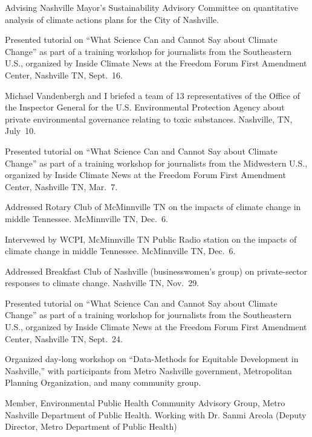 \item[2020--present] Advising Nashville Mayor's Sustainability Advisory Committee on quantitative analysis of climate actions plans for the City of Nashville.
\item[2019] Presented tutorial on ``What Science Can and Cannot Say about Climate Change'' as part of a training workshop for journalists from the Southeastern U.S., organized by Inside Climate News at the Freedom Forum First Amendment Center, Nashville TN, Sept.~16.
\item[2019] Michael Vandenbergh and I briefed a team of 13 representatives of the Office of the Inspector General for the U.S. Environmental Protection Agency about private environmental governance relating to toxic substances. Nashville, TN, July~10.
\item[2019] Presented tutorial on ``What Science Can and Cannot Say about Climate Change'' as part of a training workshop for journalists from the Midwestern U.S., organized by Inside Climate News at the Freedom Forum First Amendment Center, Nashville TN, Mar.~7.
\item[2018] Addressed Rotary Club of McMinnville TN on the impacts of climate change in middle Tennessee. McMinnville TN, Dec.\ 6.
\item[2018] Intervewed by WCPI, McMinnville TN Public Radio station on the impacts of climate change in middle Tennessee. McMinnville TN, Dec.\ 6.
\item[2018] Addressed Breakfast Club of Nashville (businesswomen's group) on private-sector responses to climate change. Nashville TN, Nov.\ 29.
\item[2018] Presented tutorial on ``What Science Can and Cannot Say about Climate Change'' as part of a training workshop for journalists from the Southeastern U.S., organized by Inside Climate News at the Freedom Forum First Amendment Center, Nashville TN, Sept.~24.
\item[2018] Organized day-long workshop on ``Data-Methods for Equitable Development in Nashville,'' with participants from Metro Nashville government, Metropolitan Planning Organization,
            and many community group.
\item[2017--present] Member, Environmental Public Health Community Advisory Group, Metro Nashville Department of Public Health. Working with Dr. Sanmi Areola (Deputy Director, Metro Department of Public Health)
